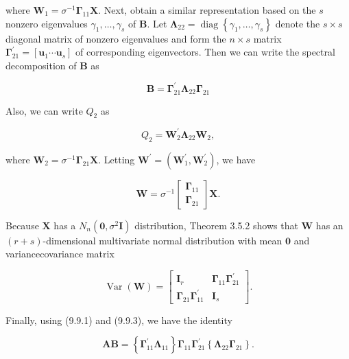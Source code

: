 where $\mathbf{W}_{1}=\sigma^{-1} \boldsymbol{\Gamma}_{11} \mathbf{X}$. Next, obtain a similar representation based on the $s$ nonzero eigenvalues $\gamma_{1}, \ldots, \gamma_{s}$ of $\mathbf{B}$. Let $\boldsymbol{\Lambda}_{22}=\operatorname{diag}\left\{\gamma_{1}, \ldots, \gamma_{s}\right\}$ denote the $s \times s$ diagonal matrix of nonzero eigenvalues and form the $n \times s$ matrix $\boldsymbol{\Gamma}_{21}^{\prime}=\left[\mathbf{u}_{1} \cdots \mathbf{u}_{s}\right]$ of corresponding eigenvectors. Then we can write the spectral decomposition of $\mathbf{B}$ as


\begin{equation*}
\mathbf{B}=\boldsymbol{\Gamma}_{21}^{\prime} \boldsymbol{\Lambda}_{22} \boldsymbol{\Gamma}_{21} \tag{9.9.3}
\end{equation*}


Also, we can write $Q_{2}$ as


\begin{equation*}
Q_{2}=\mathbf{W}_{2}^{\prime} \boldsymbol{\Lambda}_{22} \mathbf{W}_{2}, \tag{9.9.4}
\end{equation*}


where $\mathbf{W}_{2}=\sigma^{-1} \boldsymbol{\Gamma}_{21} \mathbf{X}$. Letting $\mathbf{W}^{\prime}=\left(\mathbf{W}_{1}^{\prime}, \mathbf{W}_{2}^{\prime}\right)$, we have

$$
\mathbf{W}=\sigma^{-1}\left[\begin{array}{l}
\boldsymbol{\Gamma}_{11} \\
\boldsymbol{\Gamma}_{21}
\end{array}\right] \mathbf{X} .
$$

Because $\mathbf{X}$ has a $N_{n}\left(\mathbf{0}, \sigma^{2} \mathbf{I}\right)$ distribution, Theorem 3.5.2 shows that $\mathbf{W}$ has an $(r+s)$-dimensional multivariate normal distribution with mean $\mathbf{0}$ and variancecovariance matrix

\[
\operatorname{Var}(\mathbf{W})=\left[\begin{array}{cc}
\mathbf{I}_{r} & \boldsymbol{\Gamma}_{11} \boldsymbol{\Gamma}_{21}^{\prime}  \tag{9.9.5}\\
\boldsymbol{\Gamma}_{21} \boldsymbol{\Gamma}_{11}^{\prime} & \mathbf{I}_{s}
\end{array}\right] .
\]

Finally, using (9.9.1) and (9.9.3), we have the identity


\begin{equation*}
\mathbf{A B}=\left\{\boldsymbol{\Gamma}_{11}^{\prime} \boldsymbol{\Lambda}_{11}\right\} \boldsymbol{\Gamma}_{11} \boldsymbol{\Gamma}_{21}^{\prime}\left\{\boldsymbol{\Lambda}_{22} \boldsymbol{\Gamma}_{21}\right\} . \tag{9.9.6}
\end{equation*}


